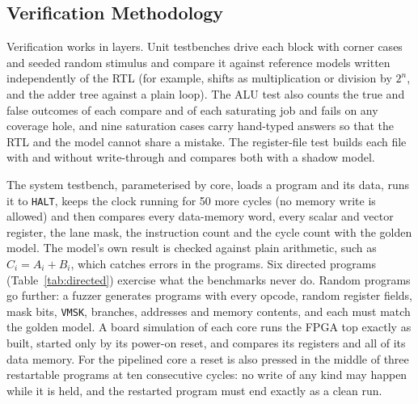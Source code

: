 \subsection{Verification Methodology}\label{sec:verif}
Verification works in layers. Unit testbenches drive each block with corner cases and
seeded random stimulus and compare it against reference models written independently of
the RTL (for example, shifts as multiplication or division by $2^n$, and the adder tree
against a plain loop). The ALU test also counts the true and false outcomes of each
compare and of each saturating job and fails on any coverage hole, and nine saturation
cases carry hand-typed answers so that the RTL and the model cannot share a mistake. The
register-file test builds each file with and without write-through and compares both with
a shadow model.

The system testbench, parameterised by core, loads a program and its data, runs it to
\texttt{HALT}, keeps the clock running for 50 more cycles (no memory write is allowed)
and then compares every data-memory word, every scalar and vector register, the lane
mask, the instruction count and the cycle count with the golden model. The model's own
result is checked against plain arithmetic, such as $C_i = A_i + B_i$, which catches
errors in the programs. Six directed programs (Table~\ref{tab:directed}) exercise what
the benchmarks never do. Random programs go further: a fuzzer generates programs with
every opcode, random register fields, mask bits, \texttt{VMSK}, branches, addresses and
memory contents, and each must match the golden model. A board simulation of each core
runs the FPGA top exactly as built, started only by its power-on reset, and compares its
registers and all of its data memory. For the pipelined core a reset is also pressed in
the middle of three restartable programs at ten consecutive cycles: no write of any kind
may happen while it is held, and the restarted program must end exactly as a clean run.

